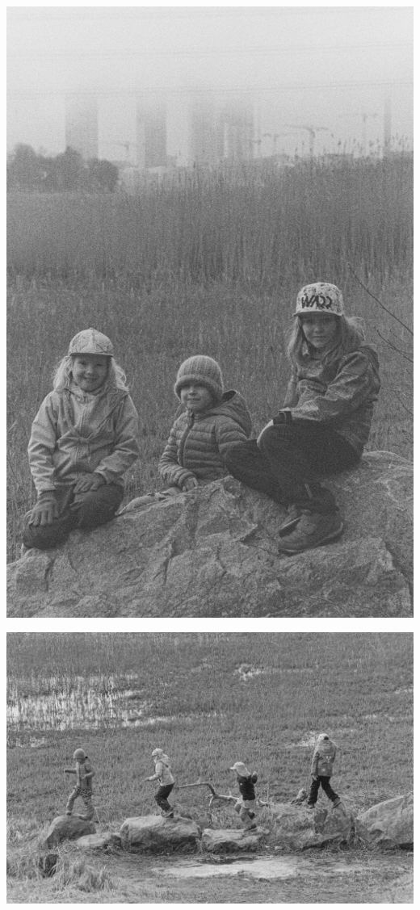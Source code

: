 \documentclass[10pt,finnish,a5paper,headings=small,twoside=semi]{scrartcl}
\begin{document}
\begin{multicols}{2}
	\vspace*{0.16cm}
	\noindent\includegraphics[width=\linewidth]{assets/kolkkienpäiväretkibw13}

\end{multicols}

\vspace*{0.16cm}
\noindent\includegraphics[width=\linewidth]{assets/kolkkienpäiväretkibw3}
\end{document}
